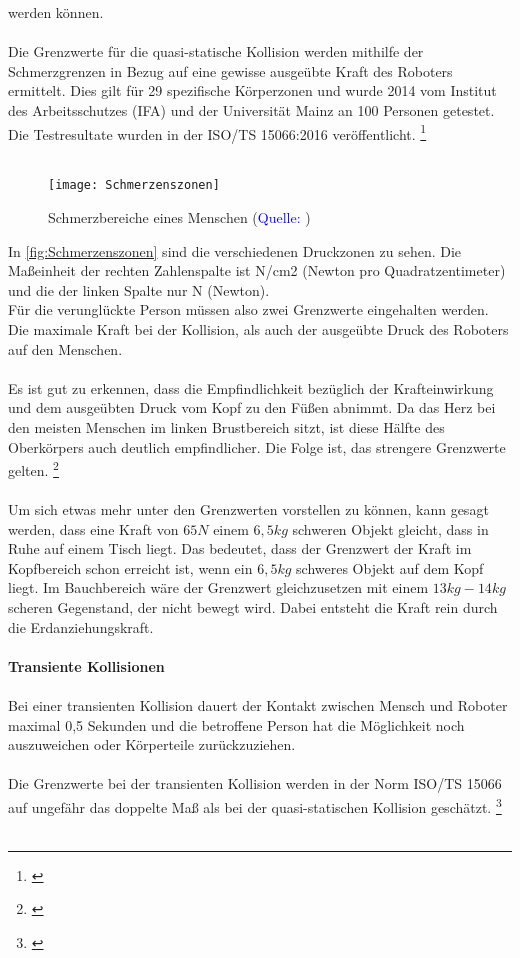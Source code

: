 \documentclass[titlepage,12pt,twoside]{article}
\begin{document}
werden können. \\
\\
Die Grenzwerte für die quasi-statische Kollision werden mithilfe der 
Schmerzgrenzen in Bezug auf eine gewisse ausgeübte Kraft des Roboters ermittelt. 
Dies gilt für 29 spezifische Körperzonen und wurde 2014 vom Institut des 
Arbeitsschutzes (IFA) und der Universität Mainz an 100 Personen getestet. Die 
Testresultate wurden in der ISO/TS 15066:2016 veröffentlicht. \footnote{\cite{Frauenhofer17}} \\
\\
\begin{figure}[H]
	\begin{center}
		\scalebox{0.5}
		{\texttt{[image: Schmerzenszonen]}}
		\caption{Schmerzbereiche eines Menschen (\textcolor{blue}{Quelle: \cite{Frauenhofer18}})}
		\label{fig:Schmerzenszonen}
	\end{center}
\end{figure}
\hfill \break
In \autoref{fig:Schmerzenszonen} sind die verschiedenen Druckzonen zu sehen. Die 
Maßeinheit der rechten Zahlenspalte ist N/cm2 (Newton pro Quadratzentimeter) und 
die der linken Spalte nur N (Newton). \\
Für die verunglückte Person müssen also zwei Grenzwerte eingehalten werden. Die 
maximale Kraft bei der Kollision, als auch der ausgeübte Druck des Roboters auf 
den Menschen. \\
\\
Es ist gut zu erkennen, dass die Empfindlichkeit bezüglich der Krafteinwirkung 
und dem ausgeübten Druck vom Kopf zu den Füßen abnimmt. Da das Herz bei den 
meisten Menschen im linken Brustbereich sitzt, ist diese Hälfte des Oberkörpers 
auch deutlich empfindlicher. Die Folge ist, das strengere Grenzwerte gelten. \footnote{\cite{Frauenhofer18}} \\
\\
Um sich etwas mehr unter den Grenzwerten vorstellen zu können, kann gesagt werden, 
dass eine Kraft von $65N$ einem $6,5kg$ schweren Objekt gleicht, dass in Ruhe auf 
einem Tisch liegt. Das bedeutet, dass der Grenzwert der Kraft im Kopfbereich 
schon erreicht ist, wenn ein $6,5kg$ schweres Objekt auf dem Kopf liegt. Im 
Bauchbereich wäre der Grenzwert gleichzusetzen mit einem $13kg-14kg$ scheren 
Gegenstand, der nicht bewegt wird. Dabei entsteht die Kraft rein durch die 
Erdanziehungskraft. \\
\\
\textbf{Transiente Kollisionen} \\
\\
Bei einer transienten Kollision dauert der Kontakt zwischen Mensch und Roboter 
maximal 0,5 Sekunden und die betroffene Person hat die Möglichkeit noch 
auszuweichen oder Körperteile zurückzuziehen. \\
\\
Die Grenzwerte bei der transienten Kollision werden in der Norm ISO/TS 15066 auf 
ungefähr das doppelte Maß als bei der quasi-statischen Kollision geschätzt. \footnote{\cite{Frauenhofer17}} \\
\\
\end{document}
